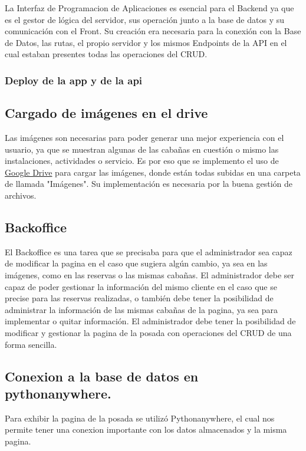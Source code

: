 La Interfaz de Programacion de Aplicaciones es esencial para el Backend ya que es el gestor de lógica del servidor, sus operación junto a la base de datos y su comunicación con el Front. Su creación era necesaria para la conexión con la Base de Datos, las rutas, el propio servidor y los mismos Endpoints de la API en el cual estaban presentes todas las operaciones del CRUD.

\subsubsection{Deploy de la app y de la api}



\subsection{Cargado de imágenes en el drive}


Las imágenes son necesarias para poder generar una mejor experiencia con el usuario, ya que se muestran algunas de las cabañas en cuestión o mismo las instalaciones, actividades o servicio. Es por eso que se implemento el uso de \href{https://drive.google.com/drive/folders/1rzJS4rG295Mjmsm-0Xie7m3Bs8-YsvL0}{Google Drive} para cargar las imágenes, donde están todas subidas en una carpeta de llamada "Imágenes". Su implementación es necesaria por la buena gestión de archivos.


\subsection{Backoffice}

El Backoffice es una tarea que se precisaba para que el administrador sea capaz de modificar la pagina en el caso que sugiera algún cambio, ya sea en las imágenes, como en las reservas o las mismas cabañas. El administrador debe ser capaz de poder gestionar la información del mismo cliente en el caso que se precise para las reservas realizadas, o también debe tener la posibilidad de administrar la información de las mismas cabañas de la pagina, ya sea para implementar o quitar información. El administrador debe tener la posibilidad de modificar y gestionar la pagina de la posada con operaciones del CRUD de una forma sencilla.

\subsection{Conexion a la base de datos en pythonanywhere.}

Para exhibir la pagina de la posada se utilizó Pythonanywhere, el cual nos permite tener una conexion importante con los datos almacenados y la misma pagina.
